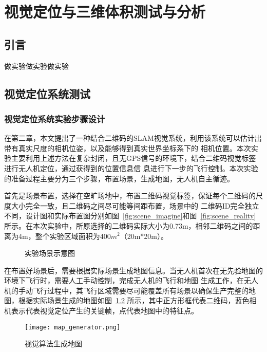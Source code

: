 \chapter{视觉定位与三维体积测试与分析}
\label{cha:chap5}
\section{引言}
\label{sec:5.1}
做实验做实验做实验
\section{视觉定位系统测试}
\label{sec:5.2}
\subsection{视觉定位系统实验步骤设计}
\label{sec:5.2.1}
在第二章，本文提出了一种结合二维码的SLAM视觉系统，利用该系统可以估计出带有真实尺度的相机位姿，以及能够得到真实世界坐标系下的
相机位置。本次实验主要利用上述方法在复杂封闭，且无GPS信号的环境下，结合二维码视觉标签进行无人机定位，通过获得到的位置信息信
息进行下一步的飞行控制。本次实验的准备过程主要分为三个步骤，布置场景，生成地图，无人机自主循迹。

首先是场景布置，选择在空旷场地中，布置二维码视觉标签，保证每个二维码的尺度大小完全一致，且二维码之间尽可能等间距布置，场景中的
二维码ID完全独立不同，设计图和实际布置图分别如图~\ref{fig:scene_imagine}和图~\ref{fig:scene_reality}所示。在本次实验中，所原选择的二维码实际大小为0.73m，相邻二维码之间的距
离为4m，整个实验区域面积为400$m^2$（20m*20m）。
\begin{figure}[H]
  \centering%
  \hspace{4em}%
  \caption{实验场景示意图}
  \label{fig:scene}
\end{figure}

在布置好场景后，需要根据实际场景生成地图信息。当无人机首次在无先验地图的环境下飞行时，需要人工手动控制，完成无人机的飞行和地图
生成工作，在无人机的手动飞行过程中，其飞行区域需要尽可能覆盖所有场景以确保生产完整的地图，根据实际场景生成的地图如图~\ref{fig:map_generator}
所示，其中正方形框代表二维码，蓝色相机表示代表视觉定位产生的关键帧，点代表地图中的特征点。

\begin{figure}[H] %
  \centering
  \texttt{[image: map\_generator.png]}
  \caption{视觉算法生成地图}
  \label{fig:map_generator}
\end{figure}

